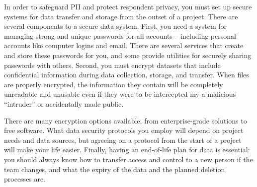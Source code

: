 In order to safeguard PII and protect respondent privacy, 
you must set up secure systems for data transfer and storage from the outset of a project.
There are several components to a secure data system.
First, you need a system for managing strong and unique passwords for 
all accounts -- including personal accounts like computer logins and email.
There are several services that create and store these passwords for you,
and some provide utilities for securely sharing passwords with others.
Second, you must encrypt datasets that include confidential information
during data collection, storage, and transfer.
When files are properly encrypted,
the information they contain will be completely unreadable and unusable
even if they were to be intercepted my a malicious
``intruder'' or accidentally made public.

There are many encryption options available, from enterprise-grade solutions to free software.
What data security protocols you employ will depend on project needs and data sources,
but agreeing on a protocol from the start of a project will make your life easier.
Finally, having an end-of-life plan for data is essential:
you should always know how to transfer access and control to a new person if the team changes,
and what the expiry of the data and the planned deletion processes are.

